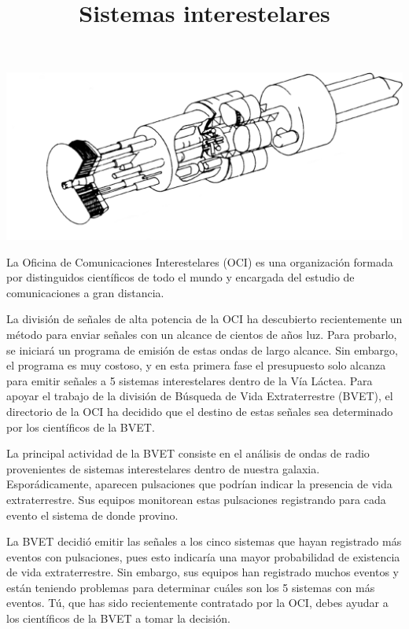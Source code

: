 \documentclass{oci}
\title{Sistemas interestelares}
\begin{document}
\begin{problemDescription}
\begin{center}
\includegraphics[scale=0.3]{interestellar.png}
\end{center}
La Oficina de Comunicaciones Interestelares (OCI) es una organización formada por distinguidos científicos de todo el mundo y encargada del estudio de comunicaciones a gran distancia.

La división de señales de alta potencia de la OCI ha descubierto recientemente un método para enviar señales con un alcance de cientos de años luz.
Para probarlo, se iniciará un programa de emisión de estas ondas de largo alcance.
Sin embargo, el programa es muy costoso, y en esta primera fase el presupuesto solo alcanza para emitir señales a 5 sistemas interestelares dentro de la Vía Láctea.
Para apoyar el trabajo de la división de Búsqueda de Vida Extraterrestre (BVET), el directorio de la OCI ha decidido que el destino de estas señales sea determinado por los científicos de la BVET.

La principal actividad de la BVET consiste en el análisis de ondas de radio provenientes de sistemas interestelares dentro de nuestra galaxia.
Esporádicamente, aparecen pulsaciones que podrían indicar la presencia de vida extraterrestre.
Sus equipos monitorean estas pulsaciones registrando para cada evento el sistema de donde provino.

La BVET decidió emitir las señales a los cinco sistemas que hayan registrado más eventos con pulsaciones, pues esto indicaría una mayor probabilidad de existencia de vida extraterrestre.
Sin embargo, sus equipos han registrado muchos eventos y están teniendo problemas para determinar cu\'ales son los 5 sistemas con más eventos.
Tú, que has sido recientemente contratado por la OCI, debes ayudar a los científicos de la BVET a tomar la decisión.

\end{problemDescription}
\end{document}
